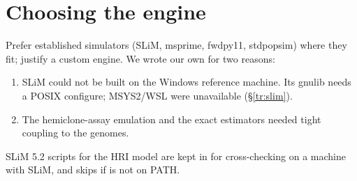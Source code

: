 \section{Choosing the engine}
Prefer established simulators (SLiM, msprime, fwdpy11, stdpopsim) where they fit; justify a custom engine. We wrote our own for two reasons:
\begin{enumerate}
\item SLiM could not be built on the Windows reference machine. Its gnulib needs a POSIX configure; MSYS2/WSL were unavailable (\S\ref{tr:slim}).
\item The hemiclone-assay emulation and the exact estimators needed tight coupling to the genomes.
\end{enumerate}
SLiM 5.2 scripts for the HRI model are kept in  for cross-checking on a machine with SLiM, and  skips if  is not on PATH.
